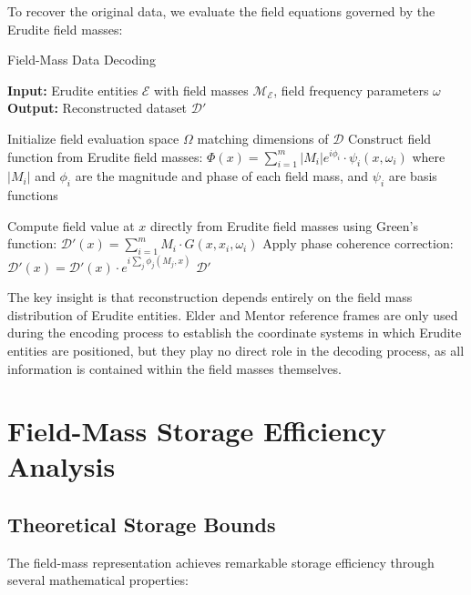 To recover the original data, we evaluate the field equations governed by the Erudite field masses:

\begin{algorithm}[h]
\caption{Field-Mass Data Decoding}
\begin{algorithmic}[1]
\State \textbf{Input:} Erudite entities $\mathcal{E}$ with field masses $\mathcal{M}_{\mathcal{E}}$, field frequency parameters $\omega$
\State \textbf{Output:} Reconstructed dataset $\mathcal{D'}$

\State Initialize field evaluation space $\Omega$ matching dimensions of $\mathcal{D}$
\State Construct field function from Erudite field masses:
\State \hspace{1em} $\Phi(x) = \sum_{i=1}^m |M_i| e^{i\phi_i} \cdot \psi_i(x, \omega_i)$
\State where $|M_i|$ and $\phi_i$ are the magnitude and phase of each field mass, and $\psi_i$ are basis functions

  \State Compute field value at $x$ directly from Erudite field masses using Green's function:
  \State \hspace{1em} $\mathcal{D'}(x) = \sum_{i=1}^m M_i \cdot G(x, x_i, \omega_i)$
  \State Apply phase coherence correction:
  \State \hspace{1em} $\mathcal{D'}(x) = \mathcal{D'}(x) \cdot e^{i\sum_j \phi_j(M_j,x)}$
\EndFor
\State \Return $\mathcal{D'}$
\end{algorithmic}
\end{algorithm}

The key insight is that reconstruction depends entirely on the field mass distribution of Erudite entities. Elder and Mentor reference frames are only used during the encoding process to establish the coordinate systems in which Erudite entities are positioned, but they play no direct role in the decoding process, as all information is contained within the field masses themselves.

\section{Field-Mass Storage Efficiency Analysis}

\subsection{Theoretical Storage Bounds}

The field-mass representation achieves remarkable storage efficiency through several mathematical properties:

